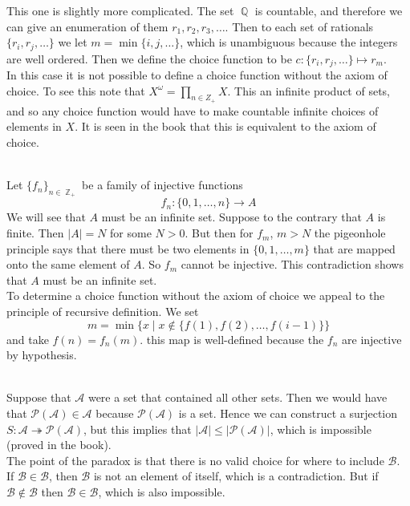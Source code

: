 \documentclass{article}
\DeclareMathOperator{\Z}{\mathbb{Z}}
\DeclareMathOperator{\Q}{\mathbb{Q}}
\DeclareMathOperator{\suchthat}{\mathrel{|}}
\DeclareMathOperator{\lra}{\longrightarrow}
\DeclareMathOperator{\onto}{\twoheadrightarrow}
\newcommand{\problem}[1]{\noindent{\textbf{Problem #1}}\\}
\newcommand{\problempart}[1]{\noindent{\textbf{(#1)}}}
\begin{document}
\problempart{c} This one is slightly more complicated. The set $\Q$ is countable, and therefore we can give an enumeration of them $r_1, r_2, r_3, \ldots$. Then to each set of rationals $\{r_i, r_j, \ldots\}$ we let $m = \min\{i,j,\ldots\}$, which is unambiguous because the integers are well ordered. Then we define the choice function to be $c: \{r_i,r_j,\ldots\} \mapsto r_m$. \\
\problempart{d} In this case it is not possible to define a choice function without the axiom of choice. To see this note that $X^\omega = \prod_{n \in Z_+} X$. This an infinite product of sets, and so any choice function would have to make countable infinite choices of elements in $X$. It is seen in the book that this is equivalent to the axiom of choice.

\problem{1.9.3} Let $\{f_n\}_{n \in \Z_+}$ be a family of injective functions
\[
f_n: \{0,1,\ldots, n\} \lra A
\]
We will see that $A$ must be an infinite set. Suppose to the contrary that $A$ is finite. Then $|A| = N$ for some $N > 0$. But then for $f_m$, $m > N$ the pigeonhole principle says that there must be two elements in $\{0,1,\ldots, m\}$ that are mapped onto the same element of $A$. So $f_m$ cannot be injective. This contradiction shows that $A$ must be an infinite set. \\
\indent To determine a choice function without the axiom of choice we appeal to the principle of recursive definition. We set 
\[
m = \min \{x \suchthat x \not\in \{f(1), f(2), \ldots, f(i-1)\}\}
\]
 and take $f(n) = f_n(m)$. this map is well-defined because the $f_n$ are injective by hypothesis. 

\problem{1.9.6}
\problempart{a} Suppose that $\mathcal{A}$ were a set that contained all other sets. Then we would have that $\mathcal{P}(\mathcal{A}) \in \mathcal{A}$ because $\mathcal{P}(\mathcal{A})$ is a set. Hence we can construct a surjection $S: \mathcal{A}\onto \mathcal{P}(\mathcal{A})$, but this implies that $|\mathcal{A}|\leq |\mathcal{P}(\mathcal{A})|$, which is impossible (proved in the book). \\
\problempart{b} The point of the paradox is that there is no valid choice for where to include $\mathcal{B}$.  If $\mathcal{B} \in \mathcal{B}$, then $\mathcal{B}$ is not an element of itself, which is a contradiction. But if $\mathcal{B} \not\in \mathcal{B}$ then $\mathcal{B} \in \mathcal{B}$, which is also impossible.
\end{document}
